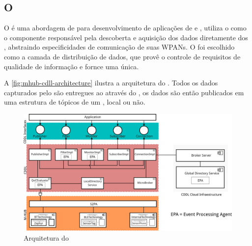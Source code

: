 \subsection*{O \middleware \mhubcddl}

O \mhubcddl é uma abordagem de \middleware para desenvolvimento de aplicações de \iomt e \iot, utiliza o \mhub como o componente responsável pela descoberta e aquisição dos dados diretamente dos \smartobjs, abstraindo especificidades de comunicação de suas WPANs. O \cddl foi escolhido como a camada de distribuição de dados, que provê o controle de requisitos de qualidade de informação e fornce uma \api única.

A \autoref{fig:mhub-cdll-architecture} ilustra a arquitetura do \middleware. Todos os dados capturados pelo \mhub são entregues ao \cddl através do \stwopa, os dados são então publicados em uma estrutura de tópicos de um \broker \mqtt, local ou não.

\begin{figure}[htb]
	\centering
	\caption{\label{fig:mhub-cdll-architecture}Arquitetura do \mhubcddl}
	\includegraphics[width=0.85\linewidth]{img/mhub-cddl-architecture.png}
\end{figure}

